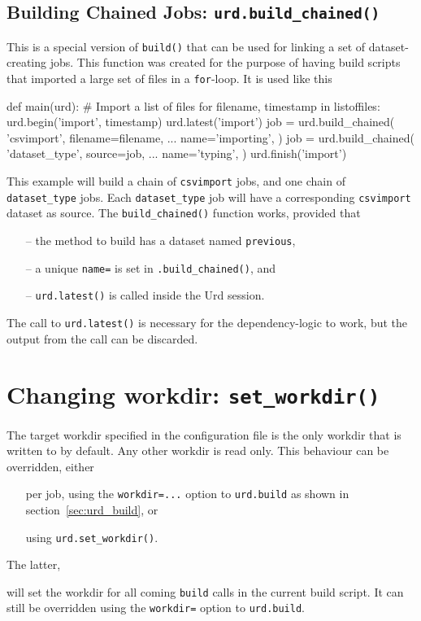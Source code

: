 \subsection{Building Chained Jobs: \texttt{urd.build\_chained()}}
This is a special version of \texttt{build()} that can be used for
linking a set of dataset-creating jobs.  This function was created for
the purpose of having build scripts that imported a large set of files
in a \texttt{for}-loop.  It is used like this
\begin{python}
def main(urd):
    # Import a list of files
    for filename, timestamp in listoffiles:
        urd.begin('import', timestamp)
        urd.latest('import')
        job = urd.build_chained(
            'csvimport',
            filename=filename,
            ...
            name='importing',
        )
        job = urd.build_chained(
            'dataset_type',
            source=job,
            ...
            name='typing',
        )
        urd.finish('import')
\end{python}
This example will build a chain of \texttt{csvimport} jobs, and one
chain of \texttt{dataset\_type} jobs.  Each \texttt{dataset\_type} job
will have a corresponding \texttt{csvimport} dataset as source.
The \texttt{build\_chained()} function works, provided that
\begin{itemize}
\item[--] the method to build has a dataset named \texttt{previous},
\item[--] a unique \texttt{name=} is set in \texttt{.build\_chained()}, and
\item[--] \texttt{urd.latest()} is called inside the Urd session.
\end{itemize}
The call to \texttt{urd.latest()} is necessary for the
dependency-logic to work, but the output from the call can be
discarded.





\section{Changing workdir:  \texttt{set\_workdir()}}
\label{sec:set_workdir}
The target workdir specified in the configuration file is the only
workdir that is written to by default.  Any other workdir is read
only.  This behaviour can be overridden, either
\begin{itemize}
\item[] per job, using the \texttt{workdir=...} option to \texttt{urd.build} as shown in section~\ref{sec:urd_build}, or
\item[] using \texttt{urd.set\_workdir()}.
\end{itemize}
The latter,
\begin{python}
def main(urd):
    urd.set_workdir(<workdir>)}
\end{python}
will set the workdir for all coming \texttt{build} calls in the
current build script.  It can still be overridden using
the \texttt{workdir=} option to \texttt{urd.build}.






